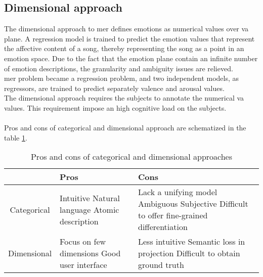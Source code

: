 \subsection{Dimensional approach}
The dimensional approach to \gls{mer} defines emotions as numerical values over \gls{va} plane. A regression model is trained to predict the emotion values that represent the affective content of a song, thereby representing the song as a point in an emotion space. Due to the fact that the emotion plane contain an infinite number of emotion descriptions, the granularity and ambiguity issues are relieved.
\\
\gls{mer} problem became a regression problem, and two independent models, as regressors, are trained to predict separately valence and arousal values.
\\
The dimensional approach requires the subjects to annotate the numerical \gls{va} values. This requirement impose an high cognitive load on the subjects.
\\ \\
Pros and cons of categorical and dimensional approach are schematized in the table \ref{table:pros_cons_categorical_dimensional}.
\begin{table}[h!]
	\centering
	\begin{tabular}{|c|p{}|p{}|}
	\hline
	& Pros & Cons\\ [0.5ex] 
	\hline\hline Categorical & Intuitive \newline Natural language \newline Atomic description & Lack a unifying model \newline Ambiguous \newline Subjective \newline Difficult to offer fine-grained differentiation \\
	\hline Dimensional & Focus on few dimensions \newline Good user interface & Less intuitive \newline Semantic loss in projection \newline Difficult to obtain ground truth \\
	\hline
	\end{tabular}
	\caption{Pros and cons of categorical and dimensional approaches}
	\label{table:pros_cons_categorical_dimensional}
\end{table}

